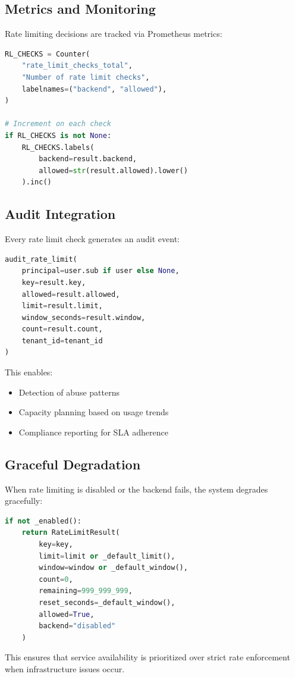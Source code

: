 \subsection{Metrics and Monitoring}
\label{subsec:rate-limit-metrics}

Rate limiting decisions are tracked via Prometheus metrics:

\begin{lstlisting}[language=Python,caption={Rate limit metrics}]
RL_CHECKS = Counter(
    "rate_limit_checks_total",
    "Number of rate limit checks",
    labelnames=("backend", "allowed"),
)

# Increment on each check
if RL_CHECKS is not None:
    RL_CHECKS.labels(
        backend=result.backend, 
        allowed=str(result.allowed).lower()
    ).inc()
\end{lstlisting}

\subsection{Audit Integration}
\label{subsec:rate-limit-audit}

Every rate limit check generates an audit event:

\begin{lstlisting}[language=Python,caption={Rate limit audit logging}]
audit_rate_limit(
    principal=user.sub if user else None,
    key=result.key,
    allowed=result.allowed,
    limit=result.limit,
    window_seconds=result.window,
    count=result.count,
    tenant_id=tenant_id
)
\end{lstlisting}

This enables:
\begin{itemize}
    \item Detection of abuse patterns
    \item Capacity planning based on usage trends
    \item Compliance reporting for SLA adherence
\end{itemize}

\subsection{Graceful Degradation}
\label{subsec:rate-limit-degradation}

When rate limiting is disabled or the backend fails, the system degrades gracefully:

\begin{lstlisting}[language=Python,caption={Disabled rate limiting bypass}]
if not _enabled():
    return RateLimitResult(
        key=key,
        limit=limit or _default_limit(),
        window=window or _default_window(),
        count=0,
        remaining=999_999_999,
        reset_seconds=_default_window(),
        allowed=True,
        backend="disabled"
    )
\end{lstlisting}

This ensures that service availability is prioritized over strict rate enforcement when infrastructure issues occur.

